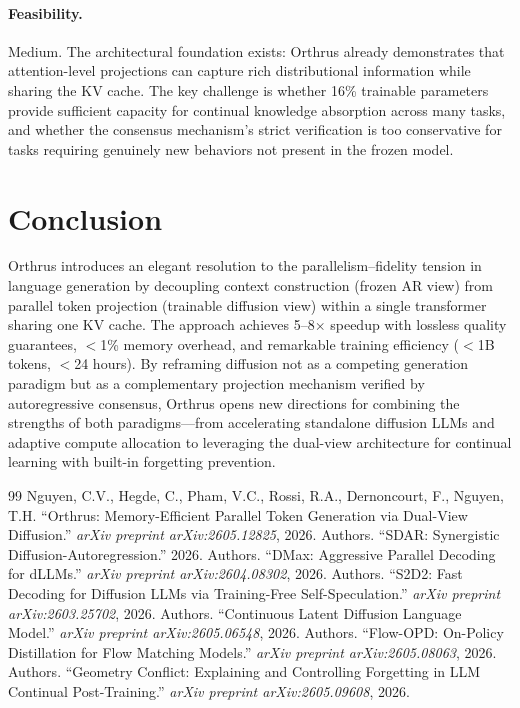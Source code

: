 \documentclass[11pt,a4paper]{article}
\begin{document}
\paragraph{Feasibility.} Medium. The architectural foundation exists: Orthrus already demonstrates that attention-level projections can capture rich distributional information while sharing the KV cache. The key challenge is whether 16\% trainable parameters provide sufficient capacity for continual knowledge absorption across many tasks, and whether the consensus mechanism's strict verification is too conservative for tasks requiring genuinely new behaviors not present in the frozen model.

\section{Conclusion}

Orthrus introduces an elegant resolution to the parallelism--fidelity tension in language generation by decoupling context construction (frozen AR view) from parallel token projection (trainable diffusion view) within a single transformer sharing one KV cache. The approach achieves 5--8$\times$ speedup with lossless quality guarantees, $<$1\% memory overhead, and remarkable training efficiency ($<$1B tokens, $<$24 hours). By reframing diffusion not as a competing generation paradigm but as a complementary projection mechanism verified by autoregressive consensus, Orthrus opens new directions for combining the strengths of both paradigms---from accelerating standalone diffusion LLMs and adaptive compute allocation to leveraging the dual-view architecture for continual learning with built-in forgetting prevention.

\begin{thebibliography}{99}
 Nguyen, C.V., Hegde, C., Pham, V.C., Rossi, R.A., Dernoncourt, F., Nguyen, T.H. ``Orthrus: Memory-Efficient Parallel Token Generation via Dual-View Diffusion.'' \textit{arXiv preprint arXiv:2605.12825}, 2026.
 Authors. ``SDAR: Synergistic Diffusion-Autoregression.'' 2026.
 Authors. ``DMax: Aggressive Parallel Decoding for dLLMs.'' \textit{arXiv preprint arXiv:2604.08302}, 2026.
 Authors. ``S2D2: Fast Decoding for Diffusion LLMs via Training-Free Self-Speculation.'' \textit{arXiv preprint arXiv:2603.25702}, 2026.
 Authors. ``Continuous Latent Diffusion Language Model.'' \textit{arXiv preprint arXiv:2605.06548}, 2026.
 Authors. ``Flow-OPD: On-Policy Distillation for Flow Matching Models.'' \textit{arXiv preprint arXiv:2605.08063}, 2026.
 Authors. ``Geometry Conflict: Explaining and Controlling Forgetting in LLM Continual Post-Training.'' \textit{arXiv preprint arXiv:2605.09608}, 2026.
\end{thebibliography}
\end{document}
